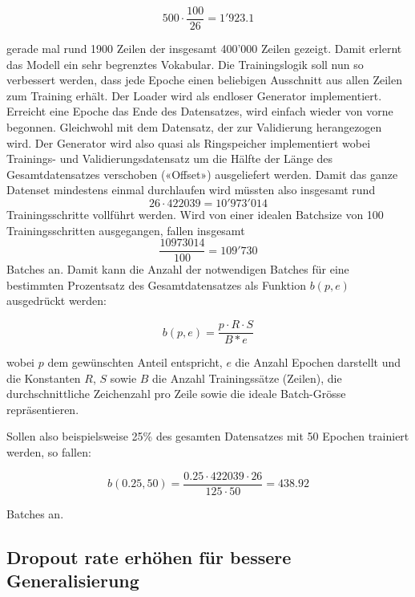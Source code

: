 \[ 500 \cdot \frac{100}{26} = 1'923.1 \]

gerade mal rund 1900 Zeilen der insgesamt 400'000 Zeilen gezeigt.
Damit erlernt das Modell ein sehr begrenztes Vokabular.
Die Trainingslogik soll nun so verbessert werden, dass jede Epoche einen beliebigen Ausschnitt aus allen Zeilen zum Training erhält.
Der Loader wird als endloser Generator implementiert.
Erreicht eine Epoche das Ende des Datensatzes, wird einfach wieder von vorne begonnen.
Gleichwohl mit dem Datensatz, der zur Validierung herangezogen wird.
Der Generator wird also quasi als Ringspeicher implementiert wobei Trainings- und Validierungsdatensatz um die Hälfte der Länge des Gesamtdatensatzes
verschoben («Offset») ausgeliefert werden.
Damit das ganze Datenset mindestens einmal durchlaufen wird müssten also insgesamt rund \[ 26 \cdot 422039 = 10'973'014 \] Trainingsschritte vollführt werden.
Wird von einer idealen Batchsize von 100 Trainingsschritten ausgegangen, fallen insgesamt \[ \frac{10973014}{100} = 109'730 \] Batches an.
Damit kann die Anzahl der notwendigen Batches für eine bestimmten Prozentsatz des Gesamtdatensatzes als Funktion $ b(p, e) $ ausgedrückt werden:

\[ b(p, e) = \frac{p \cdot R \cdot S}{B * e} \]

wobei $ p $ dem gewünschten Anteil entspricht, $ e $ die Anzahl Epochen darstellt und die Konstanten $ R $, $ S $ sowie $ B $ die Anzahl Trainingssätze (Zeilen), die durchschnittliche Zeichenzahl pro Zeile sowie
die ideale Batch-Grösse repräsentieren.

Sollen also beispielsweise 25\% des gesamten Datensatzes mit 50 Epochen trainiert werden, so fallen:

\[ b(0.25, 50) = \frac{0.25 \cdot 422039 \cdot 26}{125 \cdot 50} = 438.92 \]

Batches an.


\subsection{Dropout rate erhöhen für bessere Generalisierung}
\label{subsec:enhance-dropout-rate}